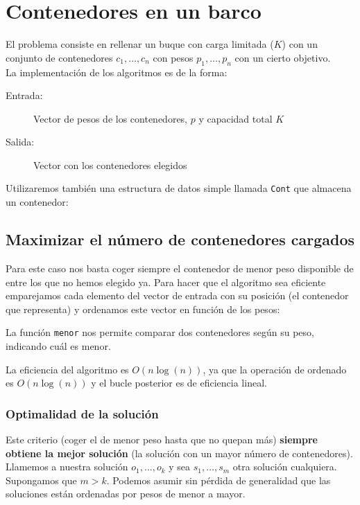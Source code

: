 
\section{Contenedores en un barco}

El problema consiste en rellenar un buque con carga limitada ($K$) con un conjunto
de contenedores $c_1,\dots, c_n$ con pesos $p_1, \dots, p_n$ con un cierto objetivo.
\\

La implementación de los algoritmos es de la forma:
\begin{description}
 \item[Entrada:] Vector de pesos de los contenedores, $p$ y capacidad total $K$
 \item[Salida:] Vector con los contenedores elegidos
\end{description}

Utilizaremos también una estructura de datos simple llamada \texttt{Cont} que almacena un
contenedor:



\subsection{Maximizar el número de contenedores cargados}

Para este caso nos basta coger siempre el contenedor de menor peso disponible de entre los
que no hemos elegido ya.
Para hacer que el algoritmo sea eficiente emparejamos cada elemento
del vector de entrada con su posición (el contenedor que representa)
y ordenamos este vector en función de los pesos:



La función \texttt{menor} nos permite comparar dos contenedores según su peso,
indicando cuál es menor.

La eficiencia del algoritmo es $O(n\log(n))$, ya que la operación de ordenado es
$O(n\log(n))$ y el bucle posterior es de eficiencia lineal.

\newpage

\subsubsection{Optimalidad de la solución}

Este criterio (coger el de menor peso hasta que no quepan más) \textbf{siempre obtiene la
mejor solución} (la solución con un mayor número de contenedores).
Llamemos a nuestra solución $o_1, \dots, o_k$ y sea $s_1, \dots, s_m$ otra solución
cualquiera. Supongamos que $m > k$. Podemos asumir sin pérdida de generalidad que las
soluciones están ordenadas por pesos de menor a mayor.

